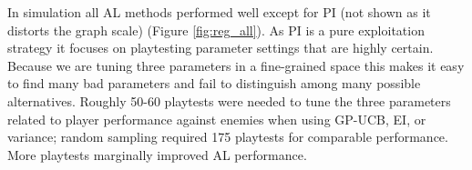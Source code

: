 \documentclass{sig-alternate}
\begin{document}

In simulation all AL methods performed well except for PI (not shown as it distorts the graph scale) (Figure \ref{fig:reg_all}).
As PI is a pure exploitation strategy it focuses on playtesting parameter settings that are highly certain.
Because we are tuning three parameters in a fine-grained space this makes it easy to find many bad parameters and fail to distinguish among many possible alternatives.
%
%
Roughly 50-60 playtests were needed to tune the three parameters related to player performance against enemies when using GP-UCB, EI, or variance; random sampling required 175 playtests for comparable performance.
More playtests marginally improved AL performance.

\end{document}
